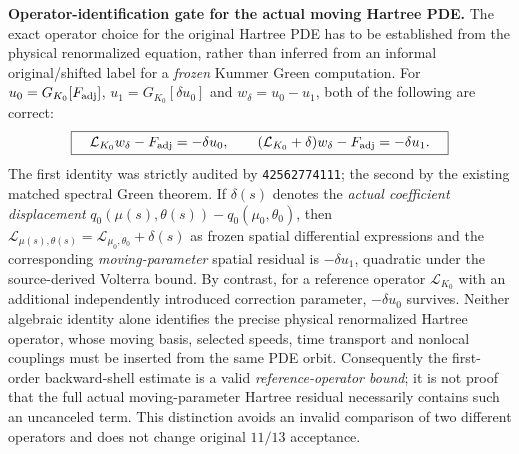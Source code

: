 \documentclass[11pt]{amsart}
\begin{document}
\medskip
\noindent\textbf{Operator-identification gate for the actual moving Hartree PDE.}
The exact operator choice for the original Hartree PDE has to be
established from the physical renormalized equation, rather than
inferred from an informal original/shifted label for a
\emph{frozen} Kummer Green computation. For
\(u_0=G_{K_0}[F_{\rm adj}]\), \(u_1=G_{K_0}[\delta u_0]\) and
\(w_\delta=u_0-u_1\), both of the following are correct:
\[
 \boxed{\quad
  \mathcal L_{K_0}w_\delta-F_{\rm adj}=-\delta u_0,
  \qquad
  (\mathcal L_{K_0}+\delta)w_\delta-F_{\rm adj}
       =-\delta u_1 .
 \quad}
\]
The first identity was strictly audited by
\texttt{42562774111}; the second by the existing matched
spectral Green theorem. If \(\delta(s)\) denotes the
\emph{actual coefficient displacement}
\(q_0(\mu(s),\theta(s))-q_0(\mu_0,\theta_0)\), then
\(\mathcal L_{\mu(s),\theta(s)}
=\mathcal L_{\mu_0,\theta_0}+\delta(s)\)
as frozen spatial differential expressions and the
corresponding \emph{moving-parameter} spatial residual is
\(-\delta u_1\), quadratic under the source-derived
Volterra bound. By contrast, for a reference operator
\(\mathcal L_{K_0}\) with an additional independently
introduced correction parameter, \(-\delta u_0\) survives.
Neither algebraic identity alone identifies the precise
physical renormalized Hartree operator, whose moving basis,
selected speeds, time transport and nonlocal couplings
must be inserted from the same PDE orbit.
Consequently the first-order backward-shell estimate is
a valid \emph{reference-operator bound}; it is not proof
that the full actual moving-parameter Hartree residual
necessarily contains such an uncanceled term. This
distinction avoids an invalid comparison of two different
operators and does not change original \(11/13\) acceptance.
\end{document}

